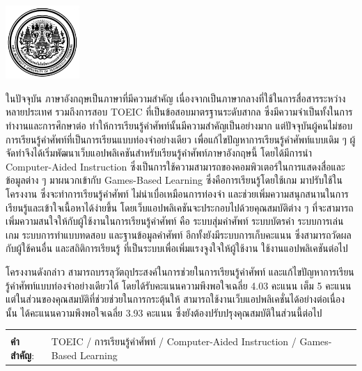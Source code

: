 \documentclass[12pt,oneside,openright,a4paper]{cpe-thai-project}
\begin{document}
\pdfstringdefDisableCommands{%
	\let\MakeUppercase\relax
}

\begin{center}
	\includegraphics[width=2.8cm]{logo02.jpg}
\end{center}
\vspace*{-1cm}

\maketitlepage
\makesignaturepage


\thaiabstract

\hspace{1cm}
ในปัจจุบัน ภาษาอังกฤษเป็นภาษาที่มีความสำคัญ เนื่องจากเป็นภาษากลางที่ใช้ในการสื่อสารระหว่างหลายประเทศ
รวมถึงการสอบ TOEIC ที่เป็นข้อสอบมาตรฐานระดับสากล ซึ่งมีความจำเป็นทั้งในการทำงานและการศึกษาต่อ
ทำให้การเรียนรู้คำศัพท์นั้นมีความสำคัญเป็นอย่างมาก แต่ปัจจุบันผู้คนไม่ชอบการเรียนรู้คำศัพท์ที่เป็นการเรียนแบบท่องจำอย่างเดียว
เพื่อแก้ไขปัญหาการเรียนรู้คำศัพท์แบบเดิม ๆ ผู้จัดทำจึงได้เริ่มพัฒนาเว็บแอปพลิเคชันสำหรับเรียนรู้คำศัพท์ภาษาอังกฤษนี้
โดยได้มีการนำ Computer-Aided Instruction ซึ่งเป็นการใช้ความสามารถของคอมพิวเตอร์ในการแสดงสื่อและข้อมูลต่าง ๆ 
มาผนวกเข้ากับ Games-Based Learning ซึ่งคือการเรียนรู้โดยใช้เกม มาปรับใช้ในโครงงาน ซึ่งจะทำการเรียนรู้คำศัพท์
ไม่น่าเบื่อเหมือนการท่องจำ และช่วยเพิ่มความสนุกสนานในการเรียนรู้และเข้าใจเนื้อหาได้ง่ายขึ้น
โดยเว็บแอปพลิเคชันจะประกอบไปด้วยคุณสมบัติต่าง ๆ ที่จะสามารถเพิ่มความสนใจให้กับผู้ใช้งานในการเรียนรู้คำศัพท์ คือ
ระบบสุ่มคำศัพท์ ระบบบัตรคำ ระบบการเล่นเกม ระบบการทำแบบทดสอบ และฐานข้อมูลคำศัพท์ 
อีกทั้งยังมีระบบการเก็บคะแนน ซึ่งสามารถวัดผลกับผู้ใช้คนอื่น และสถิติการเรียนรู้ ที่เป็นระบบเพื่อเพิ่มแรงจูงใจให้ผู้ใช้งาน
ใช้งานแอปพลิเคชันต่อไป

\hspace{1cm}
โครงงานดังกล่าว สามารถบรรลุวัตถุประสงค์ในการช่วยในการเรียนรู้คำศัพท์ และแก้ไขปัญหาการเรียนรู้คำศัพท์แบบท่องจำอย่างเดียวได้
โดยได้รับคะแนนความพึงพอใจเฉลี่ย 4.03 คะแนน เต็ม 5 คะแนน แต่ในส่วนของคุณสมบัติที่ช่วยช่วยในการกระตุ้นให้
สามารถใช้งานเว็บแอปพลิเคชั่นได้อย่างต่อเนื่องนั้น ได้คะแนนความพึงพอใจเฉลี่ย 3.93 คะแนน
ซึ่งยังต้องปรับปรุงคุณสมบัติในส่วนนี้ต่อไป
\begin{flushleft}
	\begin{tabular*}{\textwidth}{@{}lp{}}
		& \\

		\textbf{คำสำคัญ}: & TOEIC / การเรียนรู้คำศัพท์ / Computer-Aided Instruction / Games-Based Learning
	\end{tabular*}
\end{flushleft}
\endabstract
\end{document}

